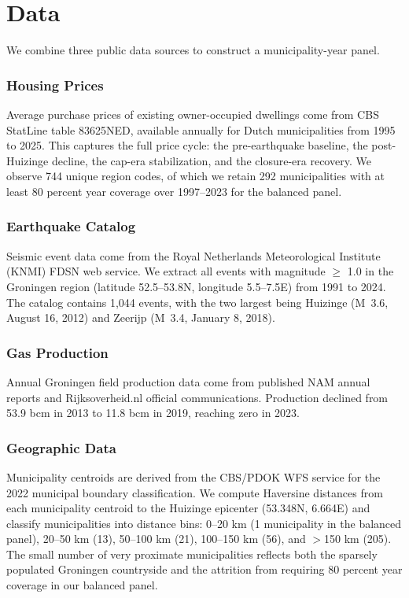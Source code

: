 \documentclass[12pt]{article}
\begin{document}
\section{Data}\label{sec:data}

We combine three public data sources to construct a municipality-year panel.

\subsubsection*{Housing Prices} Average purchase prices of existing owner-occupied dwellings come from CBS StatLine table 83625NED, available annually for Dutch municipalities from 1995 to 2025. This captures the full price cycle: the pre-earthquake baseline, the post-Huizinge decline, the cap-era stabilization, and the closure-era recovery. We observe 744 unique region codes, of which we retain 292 municipalities with at least 80 percent year coverage over 1997--2023 for the balanced panel.

\subsubsection*{Earthquake Catalog} Seismic event data come from the Royal Netherlands Meteorological Institute (KNMI) FDSN web service. We extract all events with magnitude $\geq$ 1.0 in the Groningen region (latitude 52.5--53.8\textdegree N, longitude 5.5--7.5\textdegree E) from 1991 to 2024. The catalog contains 1,044 events, with the two largest being Huizinge (M~3.6, August 16, 2012) and Zeerijp (M~3.4, January 8, 2018).

\subsubsection*{Gas Production} Annual Groningen field production data come from published NAM annual reports and Rijksoverheid.nl official communications. Production declined from 53.9 bcm in 2013 to 11.8 bcm in 2019, reaching zero in 2023.

\subsubsection*{Geographic Data} Municipality centroids are derived from the CBS/PDOK WFS service for the 2022 municipal boundary classification. We compute Haversine distances from each municipality centroid to the Huizinge epicenter (53.348\textdegree N, 6.664\textdegree E) and classify municipalities into distance bins: 0--20 km (1 municipality in the balanced panel), 20--50 km (13), 50--100 km (21), 100--150 km (56), and $>$150 km (205). The small number of very proximate municipalities reflects both the sparsely populated Groningen countryside and the attrition from requiring 80 percent year coverage in our balanced panel.
\end{document}
